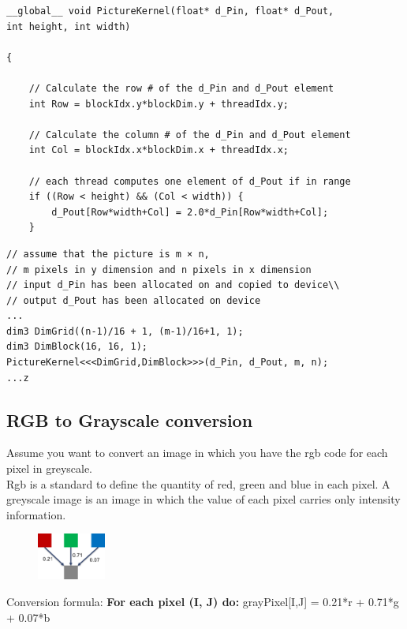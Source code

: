 \begin{verbatim}
__global__ void PictureKernel(float* d_Pin, float* d_Pout,
int height, int width)

{
	
	// Calculate the row # of the d_Pin and d_Pout element
	int Row = blockIdx.y*blockDim.y + threadIdx.y;
	
	// Calculate the column # of the d_Pin and d_Pout element
	int Col = blockIdx.x*blockDim.x + threadIdx.x;
	
	// each thread computes one element of d_Pout if in range
	if ((Row < height) && (Col < width)) {
		d_Pout[Row*width+Col] = 2.0*d_Pin[Row*width+Col];
	}
\end{verbatim}


\begin{verbatim}
// assume that the picture is m × n,
// m pixels in y dimension and n pixels in x dimension
// input d_Pin has been allocated on and copied to device\\
// output d_Pout has been allocated on device
...
dim3 DimGrid((n-1)/16 + 1, (m-1)/16+1, 1);
dim3 DimBlock(16, 16, 1);
PictureKernel<<<DimGrid,DimBlock>>>(d_Pin, d_Pout, m, n);
...z
\end{verbatim}

\subsection{RGB to Grayscale conversion}
Assume you want to convert an image in which you have the rgb code for each pixel in greyscale.\\
Rgb is a standard to define the quantity of red, green and blue in each pixel.
A greyscale image is an image in which the value of each pixel carries only intensity information.


\begin{figure}[ht]
	\centering
	\includegraphics[width=0.2\textwidth]{figure_parallel/rgb.png}
\end{figure}
\FloatBarrier
Conversion formula: \textbf{For each pixel (I, J) do:} grayPixel[I,J] = 0.21*r + 0.71*g + 0.07*b


